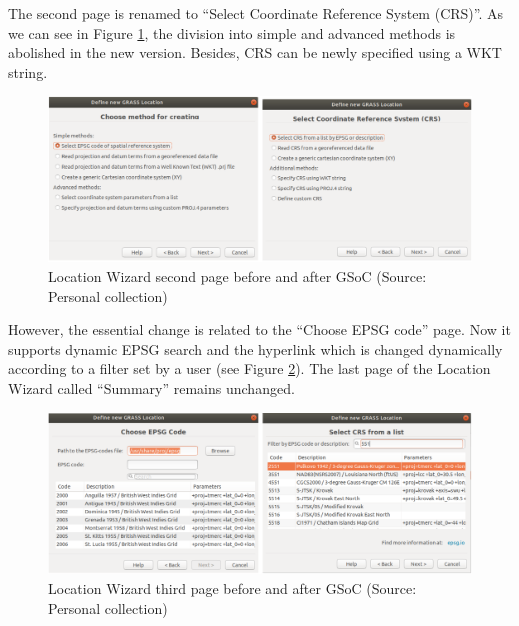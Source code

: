 \documentclass[a4paper,10pt,twoside]{article}
\begin{document}
\noindent The second page is renamed to ``Select Coordinate Reference System (CRS)''. As we can see in Figure \ref{fig:loc_wiz_2}, the division into simple and advanced methods is abolished in the new version. Besides, CRS can be newly specified using a WKT string.

\vspace{0.3cm}
\begin{figure}[hbt!] 
\begin{center}
\includegraphics[width=17cm]{../pictures/loc_wiz_2.png} 
\caption[Location Wizard second page before and after GSoC]{Location Wizard second page before and after GSoC (Source: Personal collection)}
\label{fig:loc_wiz_2}
\end{center}
\end{figure}

\noindent However, the essential change is related to the ``Choose EPSG code'' page. Now it supports dynamic EPSG search and the hyperlink which is changed dynamically according to a filter set by a user (see Figure \ref{fig:loc_wiz_3}). The last page of the Location Wizard called ``Summary'' remains unchanged.

\vspace{0.3cm}
\begin{figure}[hbt!] 
\begin{center}
\includegraphics[width=17cm]{../pictures/loc_wiz_3.png} 
\caption[Location Wizard third page before and after GSoC)]{Location Wizard third page before and after GSoC (Source: Personal collection)}
\label{fig:loc_wiz_3}
\end{center}
\end{figure}
\end{document}
